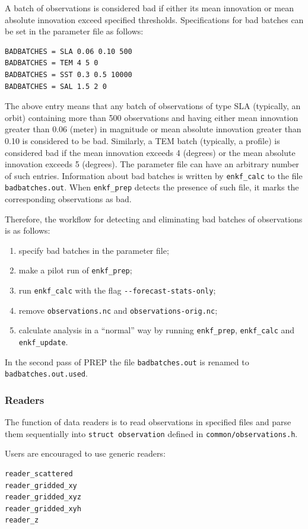 \documentclass[11pt]{report}
\begin{document}
A batch of observations is considered bad if either its mean innovation or mean absolute innovation exceed specified thresholds.
Specifications for bad batches can be set in the parameter file as follows:
\begin{Verbatim}[frame=single,fontsize=\footnotesize]
BADBATCHES = SLA 0.06 0.10 500
BADBATCHES = TEM 4 5 0
BADBATCHES = SST 0.3 0.5 10000
BADBATCHES = SAL 1.5 2 0
\end{Verbatim}
The above entry means that any batch of observations of type SLA (typically, an orbit) containing more than 500 observations and having either mean innovation greater than 0.06 (meter) in magnitude or mean absolute innovation greater than 0.10 is considered to be bad.
Similarly, a TEM batch (typically, a profile) is considered bad if the mean innovation exceeds 4 (degrees) or the mean absolute innovation exceeds 5 (degrees).
The parameter file can have an arbitrary number of such entries.
Information about bad batches is written by \verb|enkf_calc| to the file \verb|badbatches.out|.
When \verb|enkf_prep| detects the presence of such file, it marks the corresponding observations as bad.

Therefore, the workflow for detecting and eliminating bad batches of observations is as follows:
\begin{enumerate}
\item specify bad batches in the parameter file;
\item make a pilot run of \verb|enkf_prep|;
\item run \verb|enkf_calc| with the flag \verb|--forecast-stats-only|;
\item remove \verb|observations.nc| and \verb|observations-orig.nc|;
\item calculate analysis in a ``normal'' way by running \verb|enkf_prep|, \verb|enkf_calc| and \verb|enkf_update|.
\end{enumerate}
In the second pass of PREP the file \verb|badbatches.out| is renamed to \verb|badbatches.out.used|.

\subsubsection{Readers}

The function of data readers is to read observations in specified files and parse them sequentially into \verb|struct observation| defined in \verb|common/observations.h|.

Users are encouraged to use generic readers:
\begin{Verbatim}
reader_scattered
reader_gridded_xy
reader_gridded_xyz
reader_gridded_xyh
reader_z
\end{Verbatim}
\end{document}

